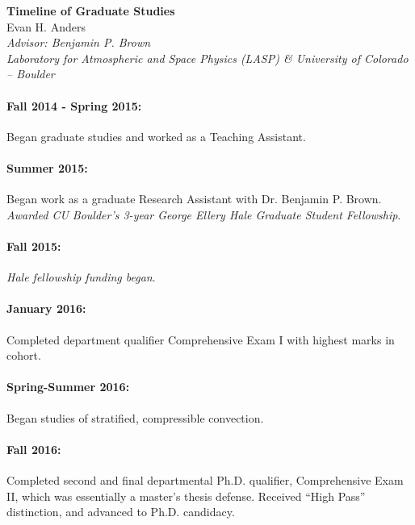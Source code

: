 \documentclass[aasms,12pt]{article}
\begin{document}
\begin{center}
   \large\textbf{Timeline of Graduate Studies}\\
   \vspace{0.4cm}
   \large{Evan H. Anders}\\
   \normalsize\textit{Advisor: Benjamin P. Brown}\\
   \normalsize\textit{Laboratory for Atmospheric and Space Physics (LASP) \& University of Colorado -- Boulder}\\
\end{center}

\paragraph{Fall 2014 - Spring 2015:} Began graduate studies and worked as a 
Teaching Assistant.
\vspace{-0.4cm}
\paragraph{Summer 2015:} Began work as a graduate Research Assistant with
	Dr. Benjamin P. Brown. \emph{Awarded CU Boulder's 3-year George Ellery Hale
	Graduate Student Fellowship}.

\vspace{-0.4cm}
\paragraph{Fall 2015:} \emph{Hale fellowship funding began}.

\vspace{-0.4cm}
\paragraph{January 2016:} Completed department qualifier Comprehensive Exam I with
highest marks in cohort.

\vspace{-0.4cm}
\paragraph{Spring-Summer 2016:} Began studies of stratified, compressible convection.

\vspace{-0.4cm}
\paragraph{Fall 2016:} Completed second and final departmental Ph.D. qualifier, Comprehensive
Exam II, which was essentially a master's thesis defense. Received ``High Pass'' distinction,
and advanced to Ph.D. candidacy.
\end{document}
